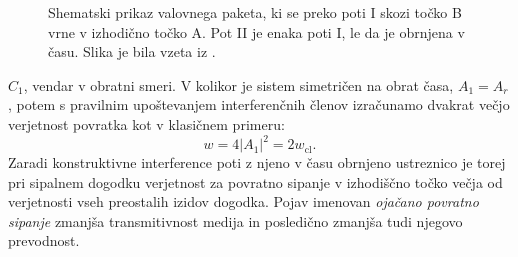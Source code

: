 \begin{minipage}[t]{0.41\textwidth}
\begin{figure}[H]
\caption{Shematski prikaz valovnega paketa, ki se preko poti I skozi točko B vrne v izhodično točko A. Pot II je enaka poti I, le da je obrnjena v času. Slika je bila vzeta iz \cite{lagendijk2009fifty}.}
\label{fig:paths} 
\end{figure}
\end{minipage}
$C_1$, vendar v obratni smeri. V kolikor je sistem simetričen na obrat 
časa, $A_1=A_r$, potem s pravilnim upoštevanjem interferenčnih  členov izračunamo dvakrat večjo verjetnost povratka kot v klasičnem primeru: 
\begin{equation}
w=4\left|A_1\right|^2=2w_\mathrm{cl}.
\end{equation}
Zaradi konstruktivne interference poti z njeno v času obrnjeno ustreznico je torej pri sipalnem dogodku verjetnost za povratno sipanje v izhodiščno točko večja od verjetnosti vseh preostalih izidov dogodka. Pojav imenovan \emph{ojačano povratno sipanje} zmanjša transmitivnost medija in posledično zmanjša tudi njegovo prevodnost. 
